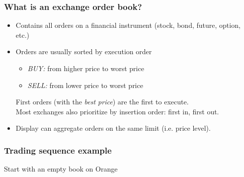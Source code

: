 \begin{frame}
\frametitle{What is an exchange order book?}
   \begin{itemize}
      \item Contains all orders on a financial instrument (stock, bond, future, option, etc.)
      \item Orders are usually sorted by execution order
         \begin{itemize}
            \item \textit{BUY:} from higher price to worst price
            \item \textit{SELL:} from lower price to worst price
         \end{itemize}
         First orders (with the \textit{best price}) are the first to execute. \\
         Most exchanges also prioritize by insertion order: first in, first out.
      \item Display can aggregate orders on the same limit (i.e. price level).
   \end{itemize}
\end{frame}

\begin{frame}
\frametitle{Trading sequence example}
   Start with an empty book on Orange
   \begin{table}
      \centering
   \end{table}
\end{frame}

